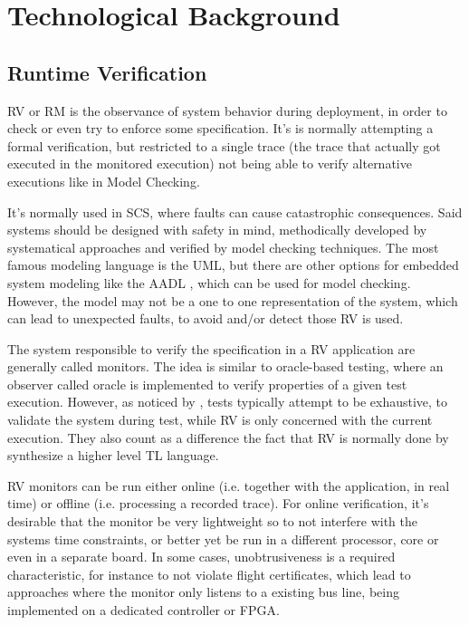 \chapter{Technological Background}\label{cap:faults_overall}

\section{Runtime Verification}\label{sec:rv}

\gls{RV} or \gls{RM} is the observance of system behavior during deployment, in order to check or even try to enforce some specification. \cite{falcone_taxonomy_2021,sanchez_survey_2019} It's is normally attempting a formal verification, but restricted to a single trace (the trace that actually got executed in the monitored execution) not being able to verify alternative executions like in Model Checking.

It's normally used in \gls{SCS}, where faults can cause catastrophic consequences. Said systems should be designed with safety in mind, methodically developed by systematical approaches and verified by model checking techniques. The most famous modeling language is the \gls{UML}, but there are other options for embedded system modeling like the \gls{AADL} \cite{feiler_model-based_2013}, which can be used for model checking. However, the model may not be a one to one representation of the system, which can lead to unexpected faults, to avoid and/or detect those \gls{RV} is used.

The system responsible to verify the specification in a \gls{RV} application are generally called monitors. The idea is similar to oracle-based testing, where an observer called oracle is implemented to verify properties of a given test execution. However, as noticed by \textcite{bauer_runtime_2011}, tests typically attempt to be exhaustive, to validate the system during test, while \gls{RV} is only concerned with the current execution. They also count as a difference the fact that \gls{RV} is normally done by synthesize a higher level \gls{TL} language. 

\gls{RV} monitors can be run either online (i.e. together with the application, in real time) or offline (i.e. processing a recorded trace). \cite{bauer_runtime_2011,broering_runtime_2023} For online verification, it's desirable that the monitor be very lightweight so to not interfere with the systems time constraints, or better yet be run in a different processor, core or even in a separate board. In some cases, unobtrusiveness is a required characteristic, for instance to not violate flight certificates, which lead to approaches where the monitor only listens to a existing bus line, being implemented on a dedicated controller or \gls{FPGA}. \cite{rozier_r2u2_nodate}

